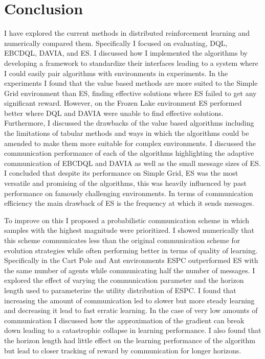 \chapter{Conclusion}

I have explored the current methods in distributed reinforcement learning and numerically compared them. Specifically I focused on evaluating, DQL, EBCDQL, DAVIA, and ES. I discussed how I implemented the algorithms by developing a framework to standardize their interfaces leading to a system where I could easily pair algorithms with environments in experiments. In the experiments I found that the value based methods are more suited to the Simple Grid environment than ES, finding effective solutions where ES failed to get any significant reward. However, on the Frozen Lake environment ES performed better where DQL and DAVIA were unable to find effective solutions. Furthermore, I discussed the drawbacks of the value based algorithms including the limitations of tabular methods and ways in which the algorithms could be amended to make them more suitable for complex environments. I discussed the communication performance of each of the algorithms highlighting the adaptive communication of EBCDQL and DAVIA as well as the small message sizes of ES. I concluded that despite its performance on Simple Grid, ES was the most versatile and promising of the algorithms, this was heavily influenced by past performance on famously challenging environments. In terms of communication efficiency the main drawback of ES is the frequency at which it sends messages.

To improve on this I proposed a probabilistic communication scheme in which samples with the highest magnitude were prioritized. I showed numerically that this scheme communicates less than the original communication scheme for evolution strategies while often performing better in terms of quality of learning. Specifically in the Cart Pole and Ant environments ESPC outperformed ES with the same number of agents while communicating half the number of messages.
I explored the effect of varying the communication parameter and the horizon length used to parameterize the utility distribution of ESPC. I found that increasing the amount of communication led to slower but more steady learning and decreasing it lead to fast erratic learning. In the case of very low amounts of communication I discussed how the approximation of the gradient can break down leading to a catastrophic collapse in learning performance. I also found that the horizon length had little effect on the learning performance of the algorithm but lead to closer tracking of reward by communication for longer horizons.

